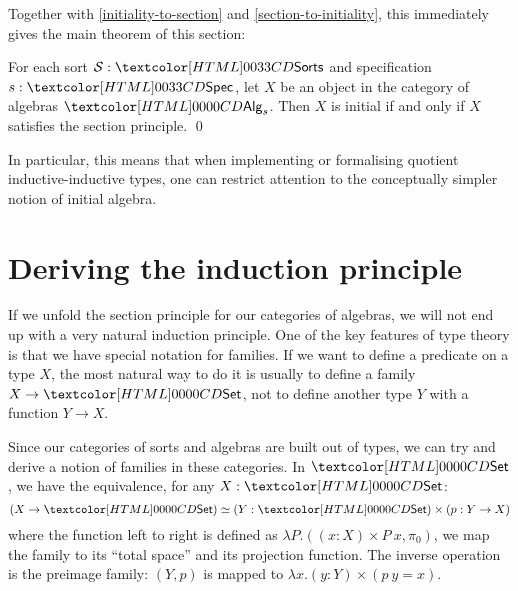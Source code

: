 Together with \cref{initiality-to-section} and
\cref{section-to-initiality}, this immediately gives the main theorem
of this section:

\begin{theorem}
\label{thm:main}
  For each sort $\Ss : \sortsty$ and specification $s : \specty$, let $X$
  be an object in the category of algebras $\Alg_s$. Then $X$ is
  initial if and only if $X$ satisfies the section principle. \qed
\end{theorem}

In particular, this means that when implementing or formalising
quotient inductive-inductive types, one can restrict attention to the
conceptually simpler notion of initial algebra.

\section{Deriving the induction principle}

If we unfold the section principle for our categories of algebras, we
will not end up with a very natural induction principle. One of the
key features of type theory is that we have special notation for
families. If we want to define a predicate on a type $X$, the most 
natural way to do it is usually to define a family $X \to \Set$, not
to define another type $Y$ with a function $Y \to X$. 

Since our categories of sorts and algebras are built out of types, we
can try and derive a notion of families in these categories. In
$\Set$, we have the equivalence, for any $X : \Set$:
$$
(X \to \Set) \simeq (Y : \Set) \times (p : Y \to X)
$$
where the function left to right is defined as
$\lambda P . ((x : X) \times P\ x , \pi_0)$, \ie we map the family to
its ``total space'' and its projection function. The inverse operation
is the preimage family: $(Y,p)$ is mapped to
$\lambda x . (y : Y) \times (p\ y = x)$. 

